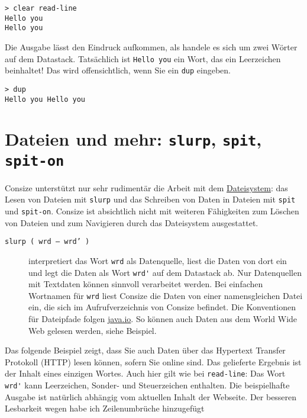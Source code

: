 \begin{verbatim}
> clear read-line
Hello you
Hello you
\end{verbatim}

Die Ausgabe lässt den Eindruck aufkommen, als handele es sich um zwei Wörter auf dem Datastack. Tatsächlich ist \verb|Hello you| ein Wort, das ein Leerzeichen beinhaltet! Das wird offensichtlich, wenn Sie ein \verb|dup| eingeben.

\begin{verbatim}
> dup
Hello you Hello you
\end{verbatim}

\section{Dateien und mehr: \texttt{slurp}, \texttt{spit}, \texttt{spit-on}}

Consize unterstützt nur sehr rudimentär die Arbeit mit dem \href{http://de.wikipedia.org/wiki/Dateisystem}{Dateisystem}: das Lesen von Dateien mit \verb|slurp| und das Schreiben von Daten in Dateien mit \verb|spit| und \verb|spit-on|. Consize ist absichtlich nicht mit weiteren Fähigkeiten zum Löschen von Dateien und zum Navigieren durch das Dateisystem ausgestattet.

\begin{description}
\item[\texttt{slurp ( wrd -- wrd' )}] interpretiert das Wort \verb|wrd| als Datenquelle, liest die Daten von dort ein und legt die Daten als Wort \verb|wrd'| auf dem Datastack ab. Nur Datenquellen mit Textdaten können sinnvoll verarbeitet werden. Bei einfachen Wortnamen für \verb|wrd| liest Consize die Daten von einer namensgleichen Datei ein, die sich im Aufrufverzeichnis von Consize befindet. Die Konventionen für Dateipfade folgen \href{http://docs.oracle.com/javase/7/docs/api/java/io/File.html}{java.io}. So können auch Daten aus dem World Wide Web gelesen werden, siehe Beispiel.
\end{description}

Das folgende Beispiel zeigt, dass Sie auch Daten über das Hypertext Transfer Protokoll (HTTP) lesen können, sofern Sie online sind. Das gelieferte Ergebnis ist der Inhalt eines einzigen Wortes. Auch hier gilt wie bei \verb|read-line|: Das Wort \verb|wrd'| kann Leerzeichen, Sonder- und Steuerzeichen enthalten. Die beispielhafte Ausgabe ist natürlich abhängig vom aktuellen Inhalt der Webseite. Der besseren Lesbarkeit wegen habe ich Zeilenumbrüche hinzugefügt

